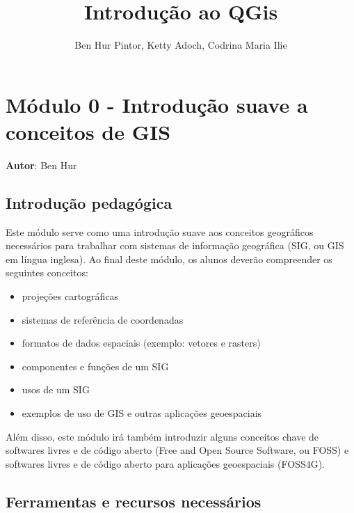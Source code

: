 \documentclass[
]{book}
\title{Introdução ao QGis}
\author{Ben Hur Pintor, Ketty Adoch, Codrina Maria Ilie}
\date{}
\providecommand{\tightlist}{%
  \setlength{\itemsep}{0pt}\setlength{\parskip}{0pt}}
\theoremstyle{definition}
\theoremstyle{definition}
\theoremstyle{definition}
\theoremstyle{definition}
\theoremstyle{remark}
\begin{document}
\maketitle

{
\setcounter{tocdepth}{1}
\tableofcontents
}
\hypertarget{muxf3dulo-0---introduuxe7uxe3o-suave-a-conceitos-de-gis}{%
\chapter{Módulo 0 - Introdução suave a conceitos de GIS}\label{muxf3dulo-0---introduuxe7uxe3o-suave-a-conceitos-de-gis}}

\textbf{Autor}: Ben Hur

\hypertarget{introduuxe7uxe3o-pedaguxf3gica}{%
\section{Introdução pedagógica}\label{introduuxe7uxe3o-pedaguxf3gica}}

Este módulo serve como uma introdução suave aos conceitos geográficos necessários para trabalhar com sistemas de informação geográfica (SIG, ou GIS em língua inglesa). Ao final deste módulo, os alunos deverão compreender os seguintes conceitos:

\begin{itemize}
\tightlist
\item
  projeções cartográficas
\item
  sistemas de referência de coordenadas
\item
  formatos de dados espaciais (exemplo: vetores e rasters)
\item
  componentes e funções de um SIG
\item
  usos de um SIG
\item
  exemplos de uso de GIS e outras aplicações geoespaciais
\end{itemize}

Além disso, este módulo irá também introduzir alguns conceitos chave de softwares livres e de código aberto (Free and Open Source Software, ou FOSS) e softwares livres e de código aberto para aplicações geoespaciais (FOSS4G).

\hypertarget{ferramentas-e-recursos-necessuxe1rios}{%
\section{Ferramentas e recursos necessários}\label{ferramentas-e-recursos-necessuxe1rios}}
\end{document}
